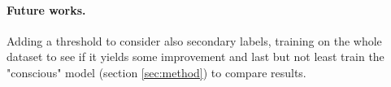 \documentclass{article}
\begin{document}
\paragraph*{Future works.}
Adding a threshold to consider also secondary labels, training on the whole dataset to see if it yields some improvement and last but not least train the "conscious" model (section \ref{sec:method}) to compare results.



\end{document}
